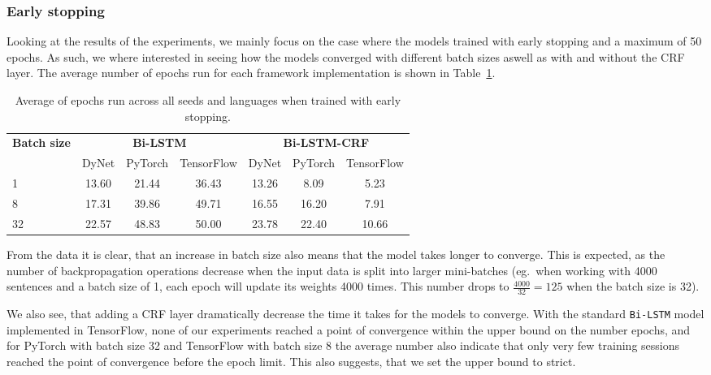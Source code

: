 \subsubsection*{Early stopping}

Looking at the results of the experiments, we mainly focus on the case where the
models trained with early stopping and a maximum of 50 epochs. As such, we where
interested in seeing how the models converged with different batch sizes aswell
as with and without the CRF layer. The average number of epochs run for each
framework implementation is shown in Table~\ref{table:epochs-run-pos}.

\begin{table}[h!]
    \centering
    \begin{tabular}{l c c c|c c c}
        \toprule
        \multirow{2}{*}{\bfseries Batch size}     &
        \multicolumn{3}{c}{\bfseries Bi-LSTM}     &
        \multicolumn{3}{c}{\bfseries Bi-LSTM-CRF} \\
        \cmidrule(lr){2-7}
        & DyNet & PyTorch & TensorFlow
        & DyNet & PyTorch & TensorFlow \\
        \cmidrule(lr){1-7}
         1 & 13.60 & 21.44 & 36.43 & 13.26 &  8.09 &  5.23 \\
         8 & 17.31 & 39.86 & 49.71 & 16.55 & 16.20 &  7.91 \\
        32 & 22.57 & 48.83 & 50.00 & 23.78 & 22.40 & 10.66 \\
        \bottomrule
    \end{tabular}
    \caption{Average of epochs run across all seeds and languages when trained
        with early stopping.
    }\label{table:epochs-run-pos}
\end{table}

From the data it is clear, that an increase in batch size also means that the
model takes longer to converge. This is expected, as the number of
backpropagation operations decrease when the input data is split into larger
mini-batches (eg.\ when working with 4000 sentences and a batch size of 1, each
epoch will update its weights 4000 times. This number drops to
$\frac{4000}{32}=125$ when the batch size is 32).

We also see, that adding a CRF layer dramatically decrease the time it takes for
the models to converge. With the standard \texttt{Bi-LSTM} model implemented in
TensorFlow, none of our experiments reached a point of convergence within the
upper bound on the number epochs, and for PyTorch with batch size 32 and
TensorFlow with batch size 8 the average number also indicate that only very few
training sessions reached the point of convergence before the epoch limit. This
also suggests, that we set the upper bound to strict.

